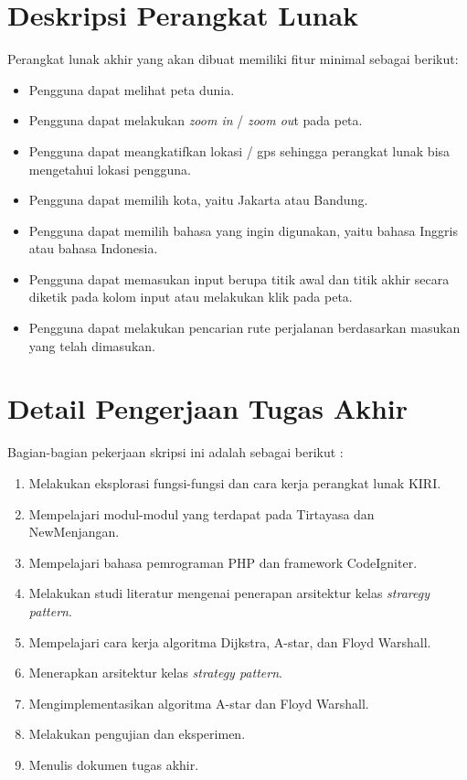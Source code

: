 \documentclass[a4paper,twoside]{article}
\begin{document}
	\section{Deskripsi Perangkat Lunak}
	Perangkat lunak akhir yang akan dibuat memiliki fitur minimal sebagai berikut:
    	\begin{itemize}
    		\item Pengguna dapat melihat peta dunia.
    		\item Pengguna dapat melakukan \textit{zoom in} / \textit{zoom ou}t pada peta.
    		\item Pengguna dapat meangkatifkan lokasi / gps sehingga perangkat lunak bisa mengetahui lokasi pengguna.
    		\item Pengguna dapat memilih kota, yaitu Jakarta atau Bandung.
    		\item Pengguna dapat memilih bahasa yang ingin digunakan, yaitu bahasa Inggris atau bahasa Indonesia. 
    		\item Pengguna dapat memasukan input berupa titik awal dan titik akhir secara diketik pada kolom input atau melakukan klik pada peta.
                \item Pengguna dapat melakukan pencarian rute perjalanan berdasarkan masukan yang telah dimasukan.
    	\end{itemize}
	
	\section{Detail Pengerjaan Tugas Akhir}	
	Bagian-bagian pekerjaan skripsi ini adalah sebagai berikut :
    	\begin{enumerate}
    		\item Melakukan eksplorasi fungsi-fungsi dan cara kerja perangkat lunak KIRI.
                \item Mempelajari modul-modul yang terdapat pada Tirtayasa dan NewMenjangan.
                \item Mempelajari bahasa pemrograman PHP dan framework CodeIgniter.
    		\item Melakukan studi literatur mengenai penerapan arsitektur kelas \textit{straregy pattern}.
    		\item Mempelajari cara kerja algoritma Dijkstra, A-star, dan Floyd Warshall.
    		\item Menerapkan arsitektur kelas \textit{strategy pattern}.
    		\item Mengimplementasikan algoritma A-star dan Floyd Warshall.
    		\item Melakukan pengujian dan eksperimen.
    		\item Menulis dokumen tugas akhir.
    	\end{enumerate}
	
\end{document}
